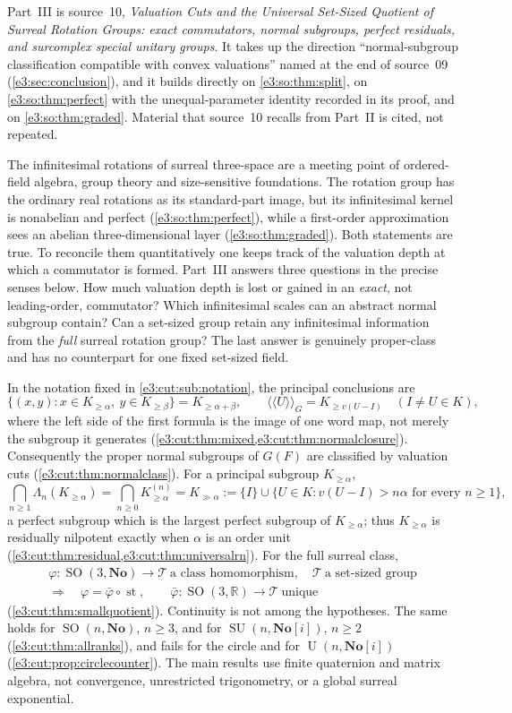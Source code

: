 \documentclass[11pt,letterpaper]{article}
\numberwithin{equation}{section}
\theoremstyle{definition}
\theoremstyle{remark}
\newcommand{\No}{\mathbf{No}}
\newcommand{\R}{\mathbb R}
\newcommand{\st}{\operatorname{st}}
\newcommand{\SO}{\operatorname{SO}}
\newcommand{\SU}{\operatorname{SU}}
\newcommand{\comm}[2]{\left(#1,#2\right)}
\newcommand{\Un}{\operatorname{U}}
\newcommand{\nc}[1]{\langle\!\langle #1\rangle\!\rangle}
\newcommand{\commset}[2]{\{\comm{x}{y}:x\in #1,\ y\in #2\}}
\begin{document}
Part~III is source~10, \emph{Valuation Cuts and the Universal Set-Sized
Quotient of Surreal Rotation Groups: exact commutators, normal subgroups,
perfect residuals, and surcomplex special unitary groups}. It takes up the
direction ``normal-subgroup classification compatible with convex valuations''
named at the end of source~09 (\cref{e3:sec:conclusion}), and it builds
directly on \cref{e3:so:thm:split}, on \cref{e3:so:thm:perfect} with the
unequal-parameter identity recorded in its proof, and on
\cref{e3:so:thm:graded}. Material that source~10 recalls from Part~II is cited,
not repeated.

The infinitesimal rotations of surreal three-space are a meeting point of
ordered-field algebra, group theory and size-sensitive foundations. The
rotation group has the ordinary real rotations as its standard-part image, but
its infinitesimal kernel is nonabelian and perfect (\cref{e3:so:thm:perfect}),
while a first-order approximation sees an abelian three-dimensional layer
(\cref{e3:so:thm:graded}). Both statements are true. To reconcile them
quantitatively one keeps track of the valuation depth at which a commutator is
formed. Part~III answers three questions in the precise senses below. How much
valuation depth is lost or gained in an \emph{exact}, not leading-order,
commutator? Which infinitesimal scales can an abstract normal subgroup contain?
Can a set-sized group retain any infinitesimal information from the
\emph{full} surreal rotation group? The last answer is genuinely
proper-class and has no counterpart for one fixed set-sized field.

In the notation fixed in \cref{e3:cut:sub:notation}, the principal
conclusions are
\[
 \commset{K_{\ge\alpha}}{K_{\ge\beta}}=K_{\ge\alpha+\beta},
 \qquad
 \nc{U}_{G}=K_{\ge v(U-I)}\quad(I\ne U\in K),
\]
where the left side of the first formula is the image of one word map, not
merely the subgroup it generates (\cref{e3:cut:thm:mixed,e3:cut:thm:normalclosure}).
Consequently the proper normal subgroups of $G(F)$ are classified by valuation
cuts (\cref{e3:cut:thm:normalclass}). For a principal subgroup
$K_{\ge\alpha}$,
\[
 \bigcap_{n\ge1}\Lambda_n(K_{\ge\alpha})
 =\bigcap_{n\ge0}K_{\ge\alpha}^{(n)}
 =K_{\gg\alpha}
 :=\{I\}\cup\{U\in K:v(U-I)>n\alpha\text{ for every }n\ge1\},
\]
a perfect subgroup which is the largest perfect subgroup of $K_{\ge\alpha}$;
thus $K_{\ge\alpha}$ is residually nilpotent exactly when $\alpha$ is an order
unit (\cref{e3:cut:thm:residual,e3:cut:thm:universalrn}). For the full surreal
class,
\[
 \begin{gathered}
 \varphi:\SO(3,\No)\to\mathcal T\ \text{a class homomorphism},\quad
 \mathcal T\ \text{a set-sized group}\\
 \Longrightarrow\quad
 \varphi=\bar\varphi\circ\st,\qquad
 \bar\varphi:\SO(3,\R)\to\mathcal T\ \text{unique}
 \end{gathered}
\]
(\cref{e3:cut:thm:smallquotient}). Continuity is not among the hypotheses.
The same holds for $\SO(n,\No)$, $n\ge3$, and for $\SU(n,\No[i])$, $n\ge2$
(\cref{e3:cut:thm:allranks}), and fails for the circle and for
$\Un(n,\No[i])$ (\cref{e3:cut:prop:circlecounter}). The main results use finite
quaternion and matrix algebra, not convergence, unrestricted trigonometry, or
a global surreal exponential.
\end{document}
